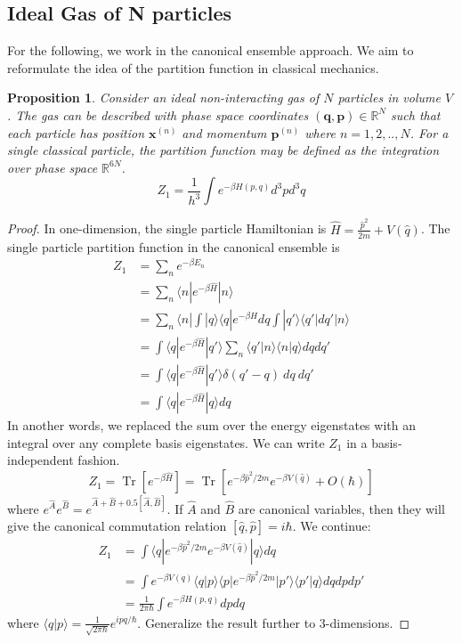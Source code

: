 \documentclass[a4paper]{article}
\DeclareMathOperator{\Tr}{Tr}
\theoremstyle{new}
\newtheorem{prop}{Proposition}[section]
\begin{document}
\subsection{Ideal Gas of N particles}
For the following, we work in the canonical ensemble approach. We aim to reformulate the idea of the partition function in classical mechanics. 
\begin{prop}
Consider an ideal non-interacting gas of $N$ particles in volume $V$. The gas can be described with phase space coordinates $(\mathbf{q},\mathbf{p})\in\mathbb{R}^N$ such that each particle has position $\mathbf{x}^{(n)}$ and momentum $\mathbf{p}^{(n)}$ where $n=1,2,..,N$. For a single classical particle, the partition function may be defined as the integration over phase space $\mathbb{R}^{6N}$. 
\begin{equation}
Z_1=\frac{1}{h^3}\int e^{-\beta H(p,q)}d^3pd^3q\label{sp}
\end{equation}
\end{prop}
\begin{proof}
In one-dimension, the single particle Hamiltonian is $\hat{H}=\frac{\hat{p}^2}{2m}+V(\hat{q})$. The single particle partition function in the canonical ensemble is
\begin{align}
    Z_1&=\sum_ne^{-\beta E_n}\nonumber\\&=\sum_n\langle n|e^{-\beta\hat{H}}|n\rangle\nonumber\\&=\sum_n\langle n|\int|q\rangle\langle q|e^{-\beta\hat{H}}dq\int|q'\rangle\langle q'|dq'|n\rangle\nonumber\\&=\int\langle q|e^{-\beta\hat{H}}|q'\rangle\sum_n\langle q'|n\rangle\langle n|q\rangle dqdq'\nonumber\\&=\int\langle q|e^{-\beta\hat{H}}|q'\rangle\delta(q'-q)~ dq~dq'\nonumber\\&=\int\langle q|e^{-\beta\hat{H}}|q\rangle dq\nonumber
\end{align}
In another words, we replaced the sum over the energy eigenstates with an integral over any complete basis eigenstates. We can write $Z_1$ in a basis-independent fashion.
$$Z_1=\Tr[e^{-\beta\hat{H}}]=\Tr[e^{-\beta \hat{p}^2/2m}e^{-\beta V(\hat{q})}+O(\hbar)]$$
where $e^{\hat{A}}e^{\hat{B}}=e^{\hat{A}+\hat{B}+0.5[\hat{A},\hat{B}]}$. If $\hat{A}$ and $\hat{B}$ are canonical variables, then they will give the canonical commutation relation $[\hat{q},\hat{p}]=i\hbar$. We continue:
\begin{align}
    Z_1&=\int\langle q|e^{-\beta\hat{p}^2/2m}e^{-\beta V(\hat{q})}|q\rangle dq\nonumber\\&=\int e^{-\beta V(q)}\langle q|p\rangle\langle p|e^{-\beta\hat{p}^2/2m}|p'\rangle\langle p'|q\rangle dqdpdp'\nonumber\\&=\frac{1}{2\pi\hbar}\int e^{-\beta H(p,q)}dpdq\nonumber
\end{align}
where $\langle q|p\rangle=\frac{1}{\sqrt{2\pi\hbar}}e^{ipq/\hbar}$. Generalize the result further to 3-dimensions.
\end{proof}
\end{document}
